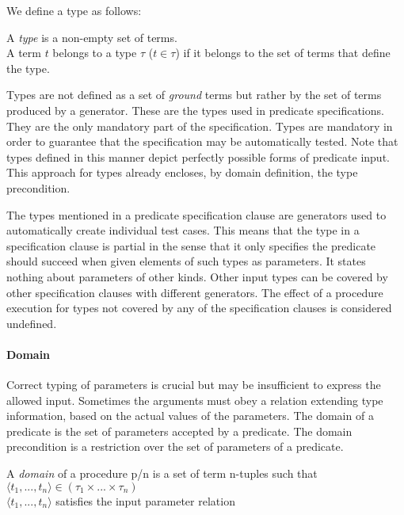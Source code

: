 We define a type as follows: 

\begin{definition}
\label{def:type}
A {\em type} is a non-empty set of terms.\\
A term $t$ belongs to a type $\tau$ ($t \in \tau$) if it belongs to the set of
terms that define the type.
\end{definition}


Types are not defined as a set of \emph{ground} terms but rather by
the set of terms produced by a generator.
%
These are the types used in predicate specifications.
%
They are the only mandatory part of the specification.
%
Types are mandatory in order to guarantee that the specification may be
automatically tested.
%
Note that types defined in this manner depict perfectly possible forms of
predicate input.
%
This approach for types already encloses, by domain definition, the type
precondition.


The types mentioned in a predicate specification clause are \plqc{}
generators used to automatically create individual test cases.
%
This means that the type in a specification clause is partial in the
sense that it only specifies the predicate should succeed when given
elements of such types as parameters.
%
It states nothing about parameters of other kinds.
%
Other input types can be covered by other specification clauses with
different generators.
%
The effect of a procedure execution for types not covered by any of the
specification clauses is considered undefined.


\paragraph{\bf Domain}

Correct typing of parameters is crucial but may be insufficient to
express the allowed input.
%
Sometimes the arguments must obey a relation extending type information,
based on the actual values of the parameters.
%
The domain of a predicate is the set of parameters accepted by a
predicate.
%
The domain precondition is a restriction over the set of parameters of a
predicate.


\begin{definition}
\label{def:domain}
A {\em domain} of a procedure p/n is a set of term
n-tuples such that\\
\qquad $\langle t_1,...,t_n \rangle \in (\tau_1 \times ... \times
\tau_n)$\\
\qquad $\langle t_1,...,t_n \rangle$ satisfies the input parameter relation
\end{definition}


